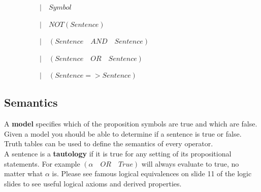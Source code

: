 \documentclass[letterpaper]{article} %
\begin{document}
$\quad\quad\quad\quad\quad | \quad Symbol$

$\quad\quad\quad\quad\quad | \quad NOT(Sentence)$

$\quad\quad\quad\quad\quad | \quad (Sentence \quad AND \quad Sentence)$

$\quad\quad\quad\quad\quad | \quad (Sentence \quad OR \quad Sentence)$

$\quad\quad\quad\quad\quad | \quad (Sentence => Sentence)$

\subsection{Semantics}

A \textbf{model} specifies which of the proposition symbols are true and which are false.\\

Given a model you should be able to determine if a sentence is true or false. Truth tables can be used to define the semantics of every operator.\\

A sentence is a \textbf{tautology} if it is true for any setting of its propositional statements. For example $(\alpha \quad OR \quad True)$ will always evaluate to true, no matter what $\alpha$ is. Please see famous logical equivalences on slide 11 of the logic slides to see useful logical axioms and derived properties.
\end{document}
